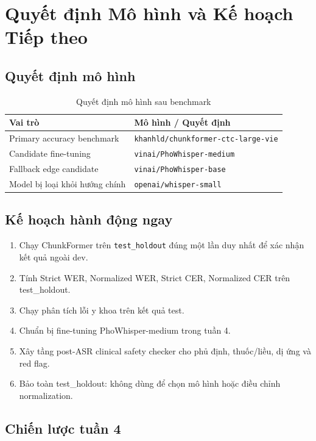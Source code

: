 \documentclass[12pt,a4paper]{article}
\begin{document}
\section{Quyết định Mô hình và Kế hoạch Tiếp theo}

\subsection{Quyết định mô hình}

\begin{table}[h]
\centering
\caption{Quyết định mô hình sau benchmark}
\begin{tabularx}{\textwidth}{|l|X|}
\hline
\textbf{Vai trò} & \textbf{Mô hình / Quyết định} \\
\hline
Primary accuracy benchmark & \texttt{khanhld/chunkformer-ctc-large-vie} \\
\hline
Candidate fine-tuning & \texttt{vinai/PhoWhisper-medium} \\
\hline
Fallback edge candidate & \texttt{vinai/PhoWhisper-base} \\
\hline
Model bị loại khỏi hướng chính & \texttt{openai/whisper-small} \\
\hline
\end{tabularx}
\end{table}

\subsection{Kế hoạch hành động ngay}

\begin{enumerate}[leftmargin=1.2cm]
    \item Chạy ChunkFormer trên \texttt{test\_holdout} đúng một lần duy nhất để xác nhận kết quả ngoài dev.
    \item Tính Strict WER, Normalized WER, Strict CER, Normalized CER trên test\_holdout.
    \item Chạy phân tích lỗi y khoa trên kết quả test.
    \item Chuẩn bị fine-tuning PhoWhisper-medium trong tuần 4.
    \item Xây tầng post-ASR clinical safety checker cho phủ định, thuốc/liều, dị ứng và red flag.
    \item Bảo toàn test\_holdout: không dùng để chọn mô hình hoặc điều chỉnh normalization.
\end{enumerate}

\subsection{Chiến lược tuần 4}
\end{document}
